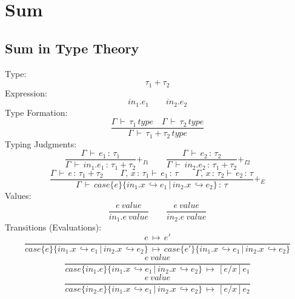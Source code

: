 \documentclass{article}
\begin{document}
\section{Sum}
\subsection*{Sum in Type Theory}
Type: 
\begin{equation*}
\tau_{1}+\tau_{2}
\end{equation*}
Expression: 
\begin{equation*}
in_{1}.e_{1}\qquad in_{2}.e_{2}\tag{injections}
\end{equation*}
Type Formation: 
\begin{equation*}
\frac{\Gamma\,\vdash\,\tau_{1}\,type\quad\Gamma\,\vdash\,\tau_{2}\,type}
{\Gamma\,\vdash\,\tau_{1}+\tau_{2}\,type}
\end{equation*}
Typing Judgments:
\begin{equation*}
\frac{\Gamma\,\vdash\,e_{1}\,:\,\tau_{1}}
{\Gamma\,\vdash\,in_{1}.e_{1}\,:\,\tau_{1}+\tau_{2}}+_{I1}
\qquad
\frac{\Gamma\,\vdash\,e_{2}\,:\,\tau_{2}}
{\Gamma\,\vdash\,in_{2}.e_{2}\,:\,\tau_{1}+\tau_{2}}+_{I2}
\end{equation*}
\begin{equation*}
\frac{\Gamma\,\vdash\,e\,:\,\tau_{1}+\tau_{2}
	\qquad\Gamma,\,x\,:\,\tau_{1}\vdash\,e_{1}\,:\,\tau
	\qquad\Gamma,\,x\,:\,\tau_{2}\vdash\,e_{2}\,:\,\tau}
{\Gamma\,\vdash\,case\{e\} \{in_{1}.x\,\hookrightarrow e_{1}\,|\,in_{2}.x\,\hookrightarrow e_{2}\}\,:\,\tau}
+_{E}
\end{equation*}
Values:
\begin{equation*}
\frac{e\ value}
{in_{1}.e\ value}
\qquad 
\frac{e\ value}
{in_{2}.e\ value}
\end{equation*}
Transitions (Evaluations):
\begin{equation*}
\frac{e\,\mapsto\,e'}
{case\{e\} \{in_{1}.x\,\hookrightarrow e_{1}\,|\,in_{2}.x\,\hookrightarrow e_{2}\}\,\mapsto\,case\{e'\} \{in_{1}.x\,\hookrightarrow e_{1}\,|\,in_{2}.x\,\hookrightarrow e_{2}\}}
\end{equation*}
\begin{equation*}
\frac{e\ value}
{case\{in_{1}.e\} \{in_{1}.x\,\hookrightarrow e_{1}\,|\,in_{2}.x\,\hookrightarrow e_{2}\}\,\mapsto\,[e/x]e_{1}}
\end{equation*}
\begin{equation*}
\frac{e\ value}
{case\{in_{2}.e\} \{in_{1}.x\,\hookrightarrow e_{1}\,|\,in_{2}.x\,\hookrightarrow e_{2}\}\,\mapsto\,[e/x]e_{2}}
\end{equation*}
\end{document}
